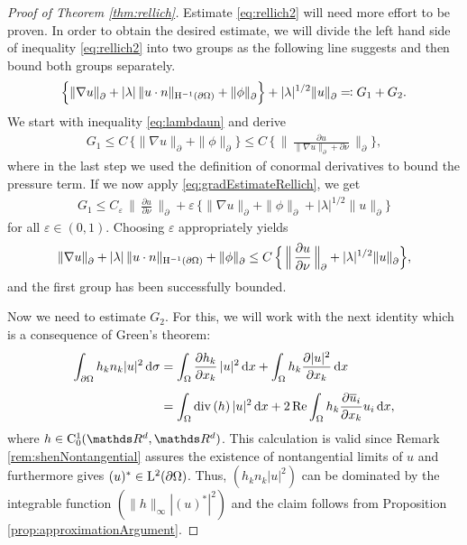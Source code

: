 \begin{proof}[Proof of Theorem \ref{thm:rellich}]
  Estimate \eqref{eq:rellich2} will need more effort to be proven.
  In order to obtain the desired estimate, we will divide the left hand side of inequality \eqref{eq:rellich2} into two groups as the following line suggests and then bound both groups separately.
  \begin{align*}
      \Big\{ \|\nabla u\|^{}_\partial + |\lambda|\, \|u \cdot n\|_{\mathrm{H}^{-1}(\partial\Omega)} + \|\phi\|^{}_\partial \Big\} + |\lambda|^{1/2} \|u\|^{}_\partial \eqqcolon G_1 + G_2.
  \end{align*}
  We start with inequality \eqref{eq:lambdaun} and derive
  \begin{align*}
    G_1
    \leq C\, \Big\{ \|\nabla u\|^{}_\partial + \| \phi\|^{}_\partial \Big\}
    \leq C \, \Big\{\, \Big\|\,\frac{\partial u}{\|\nabla u\|^{}_\partial +\partial \nu}\, \Big\|^{}_\partial  \Big\},
  \end{align*}
  where in the last step we used the definition of conormal derivatives to bound the pressure term.
  If we now apply \eqref{eq:gradEstimateRellich}, we get
  \begin{align*}
    G_1
    \leq C_\varepsilon\, \Big\| \, \frac{\partial u}{\partial \nu} \, \Big\|^{}_\partial + \varepsilon \, \Big\{ \|\nabla u\|^{}_\partial + \|\phi\|^{}_\partial + |\lambda|^{1/2} \| u \|^{}_\partial \Big\}
  \end{align*}
  for all $\varepsilon \in (0,1)$.
  Choosing $\varepsilon$ appropriately yields
  \begin{align}
    \label{eq:partOfRellich2}
    \|\nabla u\|^{}_\partial + |\lambda| \, \|u \cdot n\|_{\mathrm{H}^{-1}(\partial\Omega)}+ \|\phi\|^{}_\partial 
    \leq C\, \Big\{ \, \Big\|\,\frac{\partial u}{\partial \nu} \, \Big\|^{}_\partial + |\lambda|^{1/2} \| u\|^{}_\partial \Big\},
  \end{align}
  and the first group has been successfully bounded.

  Now we need to estimate $G_2$.
  For this, we will work with the next identity which is a consequence of Green's theorem:
  \begin{align}
    \int_{\partial\Omega} h_k n_k |u|^2 \, {\operatorname{d}\!{\sigma}}
    &= \int_{\Omega} \frac{\partial h_k}{\partial x_k}\, |u|^2 \, {\operatorname{d}\!{x}} + \int_{\Omega} h_k \frac{\partial |u|^2}{\partial x_k}  \, {\operatorname{d}\!{x}} \nonumber\\[0.5em]
    \label{eq:hknkgreen}
    &= \int_\Omega \mathrm{div\,} (h)\, |u|^2 \, {\operatorname{d}\!{x}} + 2 \operatorname{Re} \int_\Omega h_k \frac{\partial \overline u_i}{\partial x_k} u_i \, {\operatorname{d}\!{x}},
  \end{align}
  where $h \in \CC_0^1(\R^d, \R^d)$.
  This calculation is valid since Remark \ref{rem:shenNontangential} assures the existence of nontangential limits of $u$ and furthermore gives $(u)^* \in \mathrm{L}^2(\partial\Omega)$. Thus, $( h_k n_k |u|^2 )$ can be dominated by the integrable function $(\|h\|_\infty |(u)^*|^2)$ and the claim follows from Proposition \ref{prop:approximationArgument}.


\end{proof}
